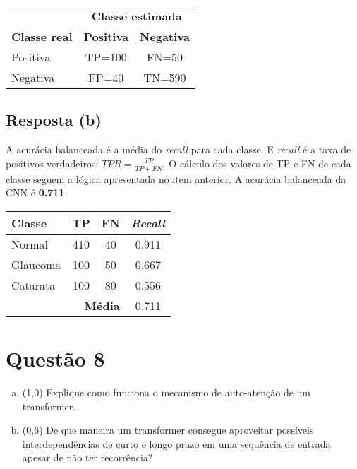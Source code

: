 \documentclass[final,3p]{elsarticle}
\numberwithin{equation}{section}
\begin{document}
        \begin{table}[H]
            \centering
            \begin{tabular}{l c c}
                \toprule
                & \multicolumn{2}{c}{\textbf{Classe estimada}} \\
                \textbf{Classe real} & \textbf{Positiva} & \textbf{Negativa} \\
                \midrule
                Positiva & TP=100 & FN=50 \\
                Negativa & FP=40 & TN=590 \\
                \bottomrule
            \end{tabular}
        \end{table}

    \subsection{Resposta \textbf{(b)}}

        A acurácia balanceada é a média do \emph{recall} para cada classe. E \emph{recall} é a taxa de positivos verdadeiros: $TPR = \frac{TP}{TP+FN}$. O cálculo dos valores de TP e FN de cada classe seguem a lógica apresentada no item anterior. A acurácia balanceada da CNN é \textbf{0.711}.

        \begin{table}[H]
            \centering
            \begin{tabular}{l c c c}
                \toprule
                \textbf{Classe} & \textbf{TP} & \textbf{FN} & \textbf{\emph{Recall}} \\
                \midrule
                Normal   & 410 & 40 & 0.911 \\
                Glaucoma & 100 & 50 & 0.667 \\
                Catarata & 100 & 80 & 0.556 \\
                \midrule
                         & \multicolumn{2}{r}{\textbf{Média}} & 0.711 \\
                \bottomrule
            \end{tabular}
        \end{table}

\section{Questão 8}

    \begin{enumerate}[(a)]
        \item (1,0) Explique como funciona o mecanismo de auto-atenção de um transformer.
        \item (0,6) De que maneira um transformer consegue aproveitar possíveis interdependências de curto e longo prazo em uma sequência de entrada apesar de não ter recorrência?
    \end{enumerate}
\end{document}
